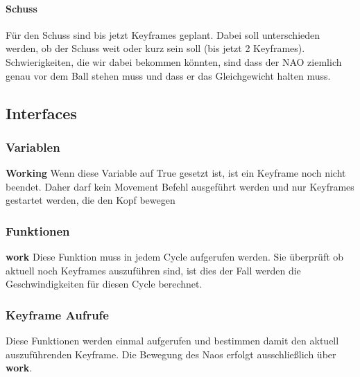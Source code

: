 \paragraph*{Schuss}
Für den Schuss sind bis jetzt Keyframes geplant. Dabei soll 
unterschieden werden, ob der Schuss weit oder kurz sein soll (bis jetzt 2
 Keyframes). Schwierigkeiten, die wir dabei bekommen könnten, sind dass 
der NAO ziemlich genau vor dem Ball stehen muss und dass er das 
Gleichgewicht halten muss.

\subsection*{Interfaces}
\subsubsection*{Variablen}
\textbf{Working}
Wenn diese Variable auf True gesetzt ist, ist ein Keyframe noch nicht 
beendet. Daher darf kein Movement Befehl ausgeführt werden und nur 
Keyframes gestartet werden, die den Kopf bewegen

\subsubsection*{Funktionen}
\textbf{work}
Diese Funktion muss in jedem Cycle aufgerufen werden. Sie überprüft ob 
aktuell noch Keyframes auszuführen sind, ist dies der Fall werden die 
Geschwindigkeiten für diesen Cycle berechnet.

\subsubsection*{Keyframe Aufrufe}
Diese Funktionen werden einmal aufgerufen und bestimmen damit den 
aktuell auszuführenden Keyframe. Die Bewegung des Naos erfolgt 
ausschließlich über \textbf{work}.

